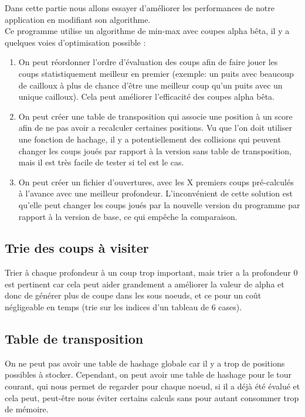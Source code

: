 \documentclass[
 aip,
 jmp,
 amsmath,amssymb,
 reprint
]{revtex4-1}
\begin{document}
Dans cette partie nous allons essayer d'améliorer les performances de notre application en modifiant son algorithme.\\
Ce programme utilise un algorithme de min-max avec coupes alpha bêta, il y a quelques voies d'optimisation possible :
\begin{enumerate}
\item On peut réordonner l'ordre d'évaluation des coups afin de faire jouer les coups statistiquement meilleur en premier (exemple: un puits avec beaucoup de cailloux à plus de chance d'être une meilleur coup qu'un puits avec un unique cailloux). Cela peut améliorer l'efficacité des coupes alpha bêta.
\item On peut créer une table de transposition qui associe une position à un score afin de ne pas avoir a recalculer certaines positions. Vu que l'on doit utiliser une fonction de hachage, il y a potentiellement des collisions qui peuvent changer les coups joués par rapport à la version sans table de transposition, mais il est très facile de tester si tel est le cas.
\item On peut créer un fichier d'ouvertures, avec les X premiers coups pré-calculés à l'avance avec une meilleur profondeur. L'inconvénient de cette solution est qu'elle peut changer les coups joués par la nouvelle version du programme par rapport à la version de base, ce qui empêche la comparaison.
\end{enumerate}

\subsection{Trie des coups à visiter}
Trier à chaque profondeur à un coup trop important, mais trier a la profondeur 0 est pertinent car cela peut aider grandement a améliorer la valeur de alpha et donc de générer plus de coupe dans les sous noeuds, et ce pour un coût négligeable en temps (trie sur les indices d'un tableau de 6 cases).

\subsection{Table de transposition}
On ne peut pas avoir une table de hashage globale car il y a trop de positions possibles à stocker. Cependant, on peut avoir une table de hashage pour le tour courant, qui nous permet de regarder pour chaque noeud, si il a déjà été évalué et cela peut, peut-être nous éviter certains calculs sans pour autant consommer trop de mémoire.
\end{document}
